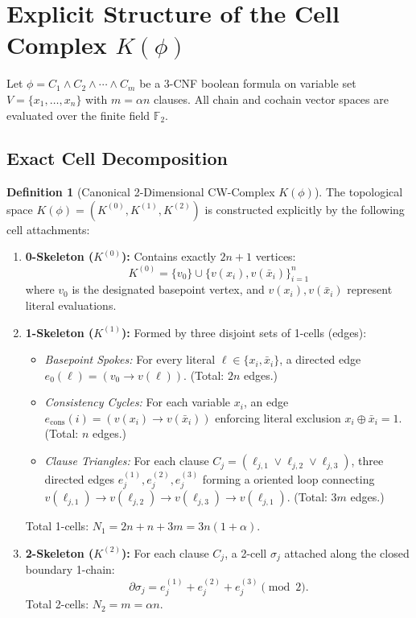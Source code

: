 \documentclass[11pt,a4paper]{article}
\theoremstyle{plain}
\theoremstyle{definition}
\newtheorem{definition}[theorem]{Definition}
\theoremstyle{remark}
\begin{document}
\section{Explicit Structure of the Cell Complex $K(\phi)$}

Let $\phi = C_1 \land C_2 \land \cdots \land C_m$ be a 3-CNF boolean formula on variable set $V = \{x_1, \dots, x_n\}$ with $m = \alpha n$ clauses. All chain and cochain vector spaces are evaluated over the finite field $\mathbb{F}_2$.

\subsection{Exact Cell Decomposition}

\begin{definition}[Canonical 2-Dimensional CW-Complex $K(\phi)$]
The topological space $K(\phi) = (K^{(0)}, K^{(1)}, K^{(2)})$ is constructed explicitly by the following cell attachments:
\begin{enumerate}
    \item \textbf{0-Skeleton ($K^{(0)}$):} Contains exactly $2n + 1$ vertices:
    \[
    K^{(0)} = \{v_0\} \cup \{v(x_i), v(\bar{x}_i)\}_{i=1}^n
    \]
    where $v_0$ is the designated basepoint vertex, and $v(x_i), v(\bar{x}_i)$ represent literal evaluations.
    
    \item \textbf{1-Skeleton ($K^{(1)}$):} Formed by three disjoint sets of 1-cells (edges):
    \begin{itemize}
        \item \emph{Basepoint Spokes:} For every literal $\ell \in \{x_i, \bar{x}_i\}$, a directed edge $e_0(\ell) = (v_0 \to v(\ell))$. (Total: $2n$ edges.)
        \item \emph{Consistency Cycles:} For each variable $x_i$, an edge $e_{\mathrm{cons}}(i) = (v(x_i) \to v(\bar{x}_i))$ enforcing literal exclusion $x_i \oplus \bar{x}_i = 1$. (Total: $n$ edges.)
        \item \emph{Clause Triangles:} For each clause $C_j = (\ell_{j,1} \lor \ell_{j,2} \lor \ell_{j,3})$, three directed edges $e_j^{(1)}, e_j^{(2)}, e_j^{(3)}$ forming a oriented loop connecting $v(\ell_{j,1}) \to v(\ell_{j,2}) \to v(\ell_{j,3}) \to v(\ell_{j,1})$. (Total: $3m$ edges.)
    \end{itemize}
    Total 1-cells: $N_1 = 2n + n + 3m = 3n(1 + \alpha)$.
    
    \item \textbf{2-Skeleton ($K^{(2)}$):} For each clause $C_j$, a 2-cell $\sigma_j$ attached along the closed boundary 1-chain:
    \[
    \partial \sigma_j = e_j^{(1)} + e_j^{(2)} + e_j^{(3)} \pmod 2.
    \]
    Total 2-cells: $N_2 = m = \alpha n$.
\end{enumerate}
\end{definition}
\end{document}
